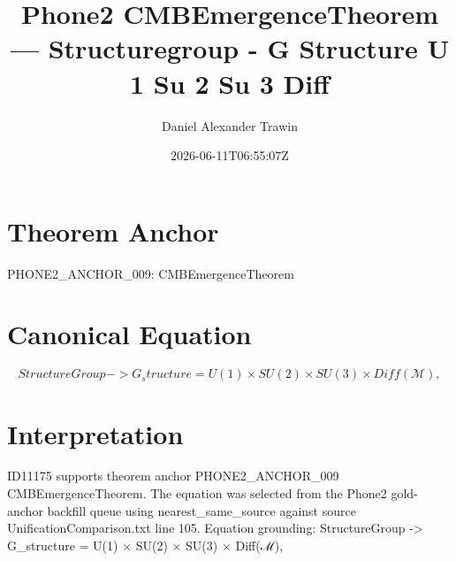\documentclass[11pt]{article}
\title{Phone2 CMBEmergenceTheorem — Structuregroup - G Structure U 1 Su 2 Su 3 Diff}
\author{Daniel Alexander Trawin}
\date{2026-06-11T06:55:07Z}
\begin{document}
\maketitle
\section*{Theorem Anchor}
PHONE2_ANCHOR_009: CMBEmergenceTheorem
\section*{Canonical Equation}
\[
StructureGroup -> G_structure = U(1) × SU(2) × SU(3) × Diff(ℳ),
\]
\section*{Interpretation}
ID11175 supports theorem anchor PHONE2_ANCHOR_009 CMBEmergenceTheorem. The equation was selected from the Phone2 gold-anchor backfill queue using nearest_same_source against source UnificationComparison.txt line 105. Equation grounding: StructureGroup -> G_structure = U(1) × SU(2) × SU(3) × Diff(ℳ),
\end{document}

